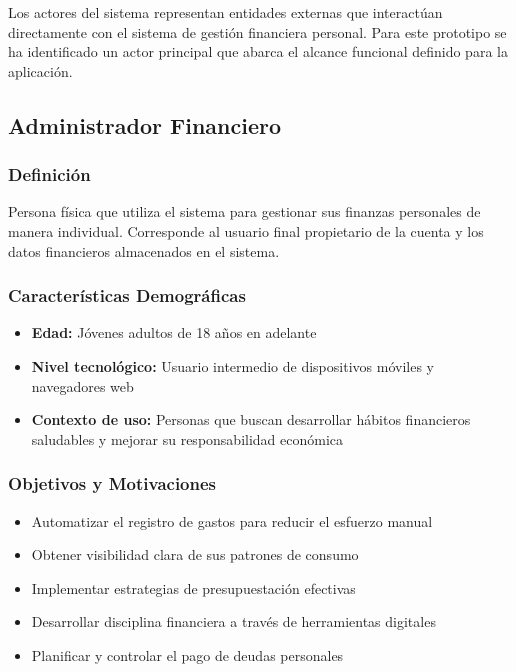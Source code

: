 Los actores del sistema representan entidades externas que interactúan directamente con el sistema de gestión financiera personal. Para este prototipo se ha identificado un actor principal que abarca el alcance funcional definido para la aplicación.

\subsection{Administrador Financiero}

\subsubsection{Definición}
Persona física que utiliza el sistema para gestionar sus finanzas personales de manera individual. Corresponde al usuario final propietario de la cuenta y los datos financieros almacenados en el sistema.

\subsubsection{Características Demográficas}
\begin{itemize}
    \item \textbf{Edad:} Jóvenes adultos de 18 años en adelante
    \item \textbf{Nivel tecnológico:} Usuario intermedio de dispositivos móviles y navegadores web
    \item \textbf{Contexto de uso:} Personas que buscan desarrollar hábitos financieros saludables y mejorar su responsabilidad económica
\end{itemize}

\subsubsection{Objetivos y Motivaciones}
\begin{itemize}
    \item Automatizar el registro de gastos para reducir el esfuerzo manual
    \item Obtener visibilidad clara de sus patrones de consumo
    \item Implementar estrategias de presupuestación efectivas
    \item Desarrollar disciplina financiera a través de herramientas digitales
    \item Planificar y controlar el pago de deudas personales
\end{itemize}

